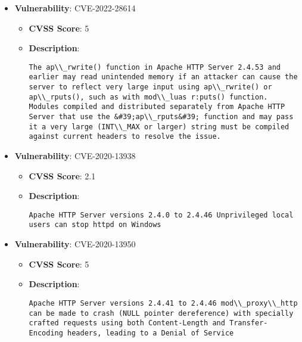 \documentclass{article}
\begin{document}
\begin{itemize}
        \item \textbf{Vulnerability}: CVE-2022-28614
        \begin{itemize}
            \item \textbf{CVSS Score}:  5 
            \item \textbf{Description}:
            \parbox[t]{0.9\linewidth}{
                \verb|The ap\\_rwrite() function in Apache HTTP Server 2.4.53 and earlier may read unintended memory if an attacker can cause the server to reflect very large input using ap\\_rwrite() or ap\\_rputs(), such as with mod\\_luas r:puts() function. Modules compiled and distributed separately from Apache HTTP Server that use the &#39;ap\\_rputs&#39; function and may pass it a very large (INT\\_MAX or larger) string must be compiled against current headers to resolve the issue.|
            }
        \end{itemize}
    
        \item \textbf{Vulnerability}: CVE-2020-13938
        \begin{itemize}
            \item \textbf{CVSS Score}:  2.1 
            \item \textbf{Description}:
            \parbox[t]{0.9\linewidth}{
                \verb|Apache HTTP Server versions 2.4.0 to 2.4.46 Unprivileged local users can stop httpd on Windows|
            }
        \end{itemize}
    
        \item \textbf{Vulnerability}: CVE-2020-13950
        \begin{itemize}
            \item \textbf{CVSS Score}:  5 
            \item \textbf{Description}:
            \parbox[t]{0.9\linewidth}{
                \verb|Apache HTTP Server versions 2.4.41 to 2.4.46 mod\\_proxy\\_http can be made to crash (NULL pointer dereference) with specially crafted requests using both Content-Length and Transfer-Encoding headers, leading to a Denial of Service|
            }
        \end{itemize}
    

\end{itemize}
\end{document}
